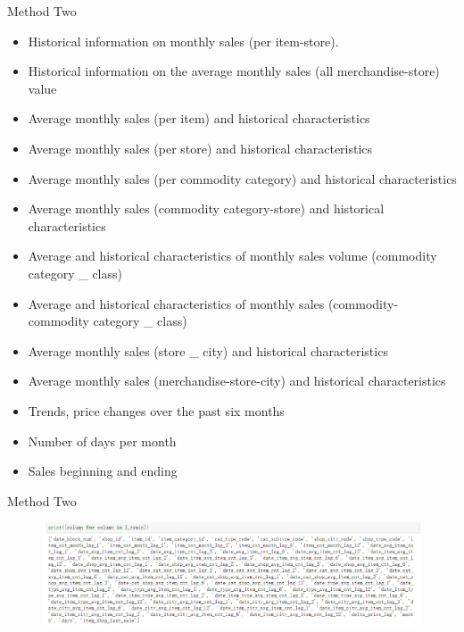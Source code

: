 \documentclass[
 size=14pt,
 paper=smartboard,  %
 mode=present, 		%
 display=slides, 	%
 style=tuliplab,  	%
 pauseslide,
 fleqn,leqno]{powerdot}
\begin{document}
\begin{slide}[toc=,bm=]{Method Two}
  \begin{itemize}
    \item Historical information on monthly sales (per item-store).
    \item Historical information on the average monthly sales (all merchandise-store) value
    \item Average monthly sales (per item) and historical characteristics
    \item Average monthly sales (per store) and historical characteristics
    \item Average monthly sales (per commodity category) and historical characteristics
    \item Average monthly sales (commodity category-store) and historical characteristics
    \item Average and historical characteristics of monthly sales volume (commodity category _ class)
    \item Average and historical characteristics of monthly sales (commodity-commodity category _ class)
    \item Average monthly sales (store _ city) and historical characteristics
    \item Average monthly sales (merchandise-store-city) and historical characteristics
    \item Trends, price changes over the past six months
    \item Number of days per month
    \item Sales beginning and ending
  \end{itemize}
\end{slide}

\begin{slide}[toc=,bm=]{Method Two}
  \begin{figure}
    \includegraphics[scale=0.5]{picture/data_16.eps}
  \end{figure}
\end{slide}
\end{document}
